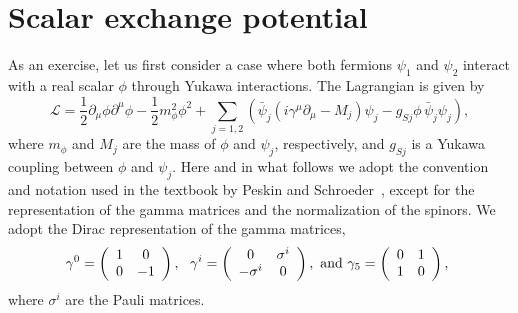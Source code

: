\documentclass[12pt, a4paper]{article}
\begin{document}
\section{Scalar exchange potential}
As an exercise, let us first consider a case where both fermions $\psi_1$ and $\psi_2$ interact with a real scalar $\phi$
through Yukawa interactions. The Lagrangian is given by
%
\begin{equation}
\mathcal{L}=\frac{1}{2}\partial_\mu\phi\partial^\mu\phi
-\frac{1}{2}m_\phi^2\phi^2 + \sum_{j=1,2} \left(\bar{\psi}_j(i\gamma^\mu\partial_\mu-M_j)\psi_j
- g_{Sj}\phi\,\bar{\psi}_j\psi_j \right)
\label{yukawa},
\end{equation} 
%
where $m_\phi$ and $M_j$ are the mass of $\phi$ and $\psi_j$, respectively, and $g_{Sj}$ is a Yukawa coupling
between $\phi$ and $\psi_j$.
Here and in what follows we adopt  the convention and notation used in the textbook by Peskin and 
Schroeder~\cite{Peskin:1995ev}, except for the representation of the gamma matrices and the normalization of the
spinors. We adopt the Dirac representation of the gamma matrices,
\begin{equation}
\gamma^0 = \left(
\begin{array}{cc}
1&0\\
0&-1
\end{array}
\right),~~
\gamma^i = \left(
\begin{array}{cc}
0&\sigma^i\\
-\sigma^i&0
\end{array}
\right),~{\rm and}~
\gamma_5 = \left(
\begin{array}{cc}
0&1\\
1&0
\end{array}
\right),~
\end{equation}
where $\sigma^i$ are the Pauli matrices.
\end{document}
